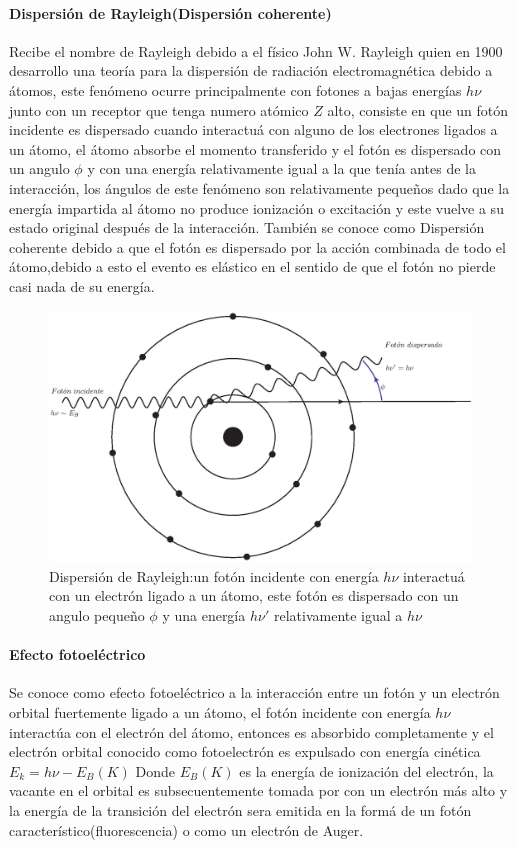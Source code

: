 \paragraph{Dispersión de Rayleigh(Dispersión coherente)}
Recibe el nombre de Rayleigh debido a el físico John W. Rayleigh quien en 1900 desarrollo una teoría para la dispersión de radiación electromagnética debido a átomos, este fenómeno ocurre principalmente con fotones a bajas energías $h\nu$ junto con un receptor que tenga numero atómico $Z$ alto, consiste en que un fotón incidente es dispersado cuando interactuá con alguno de los electrones ligados a un átomo, el átomo absorbe el momento transferido y el fotón es dispersado con un angulo $\phi$ y con una energía relativamente igual a la que tenía antes de la interacción, los ángulos de este fenómeno son relativamente pequeños dado que la energía impartida al átomo no produce ionización o excitación y este vuelve a su estado original después de la interacción\cite{Podgorsak}.
También se conoce como Dispersión coherente debido a que el fotón es dispersado por  la acción combinada de todo el átomo,debido a esto el evento es elástico en el sentido de que el fotón no pierde casi nada de su energía\cite{Frank}.

\begin{figure}[htbp]
    \centering
    \includegraphics[width=.71\linewidth]{./Figures/Ray.eps}
    \caption[Dispersión de Rayleigh]{Dispersión de Rayleigh:un fotón incidente con energía $h\nu$ interactuá con un electrón ligado a un átomo, este fotón es dispersado con un angulo pequeño $\phi$ y una energía $h\nu '$ relativamente igual a $h\nu$ }
    \label{fig:DR}
\end{figure}


\paragraph{Efecto fotoeléctrico}

Se conoce como efecto fotoeléctrico a la interacción entre un fotón y un electrón orbital fuertemente ligado a un átomo, el fotón incidente con energía $h\nu$ interactúa con el electrón del átomo, entonces es absorbido completamente y el electrón orbital conocido como fotoelectrón es expulsado con energía cinética $E_k=h\nu-E_B(K)$ Donde $E_B(K)$ es la energía de ionización del electrón, la vacante en el orbital es subsecuentemente tomada por con un electrón más alto y la energía de la transición del electrón sera emitida en la formá de un fotón característico(fluorescencia) o como un electrón de Auger.

